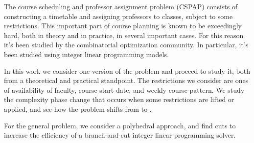 The course scheduling and professor assignment problem (CSPAP) consists of constructing a timetable and assigning professors to classes, subject to some restrictions. This important part of course planning is known to be exceedingly hard, both in theory and in practice, in several important cases. For this reason it's been studied by the combinatorial optimization community. In particular, it's been studied using integer linear programming models.

In this work we consider one version of the problem and proceed to study it, both from a theoretical and practical standpoint. The restrictions we consider are ones of availability of faculty, course start date, and weekly course pattern. We study the complexity phase change that occurs when some restrictions are lifted or applied, and see how the problem shifts from \p to \npc.

For the general problem, we consider a polyhedral approach, and find cuts to increase the efficiency of a branch-and-cut integer linear programming solver.
